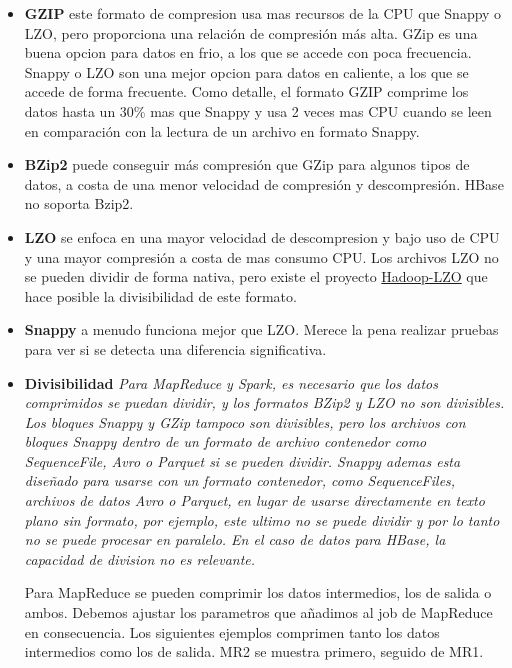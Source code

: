 \documentclass[a4paper,10pt]{article}
\begin{document}
\begin{itemize}

\item \textbf{GZIP} este formato de compresion usa mas recursos de la CPU que Snappy o LZO, pero proporciona una relación de compresión más alta. GZip es una buena opcion para datos en frio, a los que se accede con poca frecuencia. Snappy o LZO son una mejor opcion para datos en caliente, a los que se accede de forma frecuente. Como detalle, el formato GZIP comprime los datos hasta un 30\% mas que Snappy y usa 2 veces mas CPU cuando se leen en comparación con la lectura de un archivo en formato Snappy. 

\item \textbf{BZip2} puede conseguir más compresión que GZip para algunos tipos de datos, a costa de una menor velocidad de compresión y descompresión. HBase no soporta Bzip2.

\item \textbf{LZO} se enfoca en una mayor velocidad de descompresion y bajo uso de CPU y una mayor compresión a costa de mas consumo CPU. Los archivos LZO no se pueden dividir de forma nativa, pero existe el proyecto \href{https://www.anaconda.com/}{Hadoop-LZO} que hace posible la divisibilidad de este formato.

\item \textbf{Snappy} a menudo funciona mejor que LZO. Merece la pena realizar pruebas para ver si se detecta una diferencia significativa.

\item \textbf{Divisibilidad} \textit{Para MapReduce y Spark, es necesario que los datos comprimidos se puedan dividir, y los formatos BZip2 y LZO no son divisibles. Los bloques Snappy y GZip tampoco son divisibles, pero los archivos con bloques Snappy dentro de un formato de archivo contenedor como SequenceFile, Avro o Parquet si se pueden dividir. Snappy ademas esta diseñado para usarse con un formato contenedor, como SequenceFiles, archivos de datos Avro o Parquet, en lugar de usarse directamente en texto plano sin formato, por ejemplo, este ultimo no se puede dividir y por lo tanto no se puede procesar en paralelo. En el caso de datos para HBase, la capacidad de division no es relevante.}

\clearpage

Para MapReduce se pueden comprimir los datos intermedios, los de salida o ambos. Debemos ajustar los parametros que añadimos al job de MapReduce en consecuencia. Los siguientes ejemplos comprimen tanto los datos intermedios como los de salida. MR2 se muestra primero, seguido de MR1.
  

\end{itemize}
\end{document}
